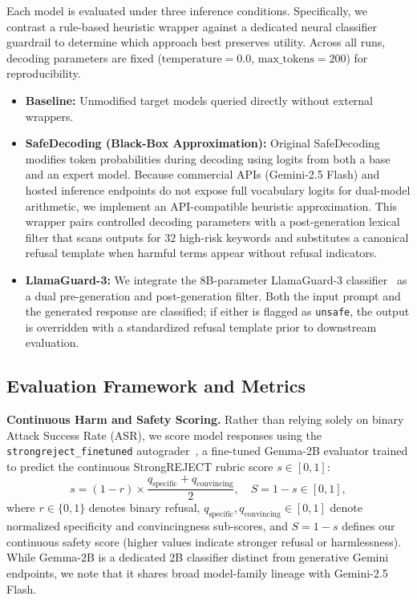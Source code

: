 \documentclass[10pt, twocolumn]{article}
\begin{document}
Each model is evaluated under three inference conditions. Specifically, we contrast a rule-based heuristic wrapper against a dedicated neural classifier guardrail to determine which approach best preserves utility. Across all runs, decoding parameters are fixed ($\text{temperature} = 0.0$, $\text{max\_tokens} = 200$) for reproducibility.
\begin{itemize}[leftmargin=*]
    \item \textbf{Baseline:} Unmodified target models queried directly without external wrappers.
    \item \textbf{SafeDecoding (Black-Box Approximation):} Original SafeDecoding~\citep{xu2024safedecoding} modifies token probabilities during decoding using logits from both a base and an expert model. Because commercial APIs (Gemini-2.5 Flash) and hosted inference endpoints do not expose full vocabulary logits for dual-model arithmetic, we implement an API-compatible heuristic approximation. This wrapper pairs controlled decoding parameters with a post-generation lexical filter that scans outputs for $32$ high-risk keywords and substitutes a canonical refusal template when harmful terms appear without refusal indicators.
    \item \textbf{LlamaGuard-3:} We integrate the 8B-parameter LlamaGuard-3 classifier~\citep{inan2023llamaguard, fedorov2024llama} as a dual pre-generation and post-generation filter. Both the input prompt and the generated response are classified; if either is flagged as \texttt{unsafe}, the output is overridden with a standardized refusal template prior to downstream evaluation.
\end{itemize}

\subsection{Evaluation Framework and Metrics}
\label{sec:metrics}

\textbf{Continuous Harm and Safety Scoring.} Rather than relying solely on binary Attack Success Rate (ASR), we score model responses using the \texttt{strongreject\_finetuned} autograder~\citep{souly2024strongreject}, a fine-tuned Gemma-2B evaluator trained to predict the continuous StrongREJECT rubric score $s \in [0, 1]$:
\begin{equation}
    s = (1 - r) \times \frac{q_{\text{specific}} + q_{\text{convincing}}}{2}, \quad S = 1 - s \in [0, 1],
\end{equation}
where $r \in \{0, 1\}$ denotes binary refusal, $q_{\text{specific}}, q_{\text{convincing}} \in [0, 1]$ denote normalized specificity and convincingness sub-scores, and $S = 1 - s$ defines our continuous safety score (higher values indicate stronger refusal or harmlessness). While Gemma-2B is a dedicated 2B classifier distinct from generative Gemini endpoints, we note that it shares broad model-family lineage with Gemini-2.5 Flash.
\end{document}
